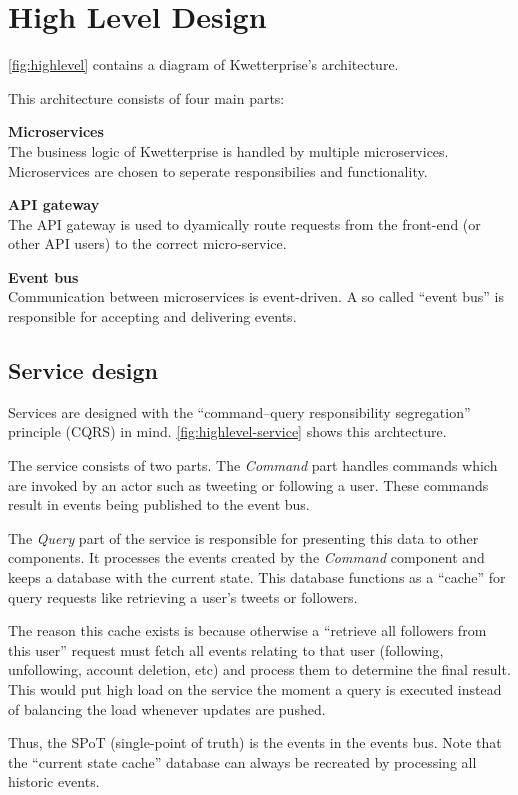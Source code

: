 \chapter{High Level Design}
\cref{fig:highlevel} contains a diagram of Kwetterprise's architecture.

\begin{tefigure}[H][centering]
\end{tefigure}

This architecture consists of four main parts:
\begin{teitemize}
    \item \textbf{Microservices}\\
    The business logic of Kwetterprise is handled by multiple microservices. Microservices are chosen to seperate responsibilies and functionality.
    \item \textbf{API gateway}\\
    The API gateway is used to dyamically route requests from the front-end (or other API users) to the correct micro-service.
    \item \textbf{Event bus}\\
    Communication between microservices is event-driven. A so called ``event bus'' is responsible for accepting and delivering events.
\end{teitemize}

\section{Service design}
Services are designed with the ``command–query responsibility segregation'' principle (CQRS) in mind. \cref{fig:highlevel-service} shows this archtecture.

\begin{tefigure}[h][centering]
\end{tefigure}

The service consists of two parts. The \textit{Command} part handles commands which are invoked by an actor such as tweeting or following a user. These commands result in events being published to the event bus.

The \textit{Query} part of the service is responsible for presenting this data to other components. It processes the events created by the \textit{Command} component and keeps a database with the current state. This database functions as a ``cache'' for query requests like retrieving a user's tweets or followers.

\FloatBarrier%
The reason this cache exists is because otherwise a ``retrieve all followers from this user'' request must fetch all events relating to that user (following, unfollowing, account deletion, etc) and process them to determine the final result. This would put high load on the service the moment a query is executed instead of balancing the load whenever updates are pushed.

Thus, the SPoT (single-point of truth) is the events in the events bus. Note that the ``current state cache'' database can always be recreated by processing all historic events.